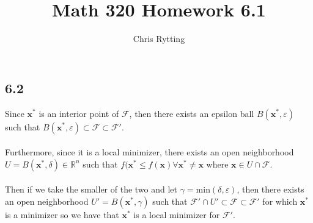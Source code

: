 \documentclass[letterpaper,12pt]{article}
\theoremstyle{definition}
\begin{document}
\title{Math 320 Homework 6.1}
\author{Chris Rytting}
\maketitle

\subsection*{6.2}
Since $\textbf{x}^* $ is an interior point of $\mathscr{F}$, then there exists an epsilon ball $B(\textbf{x}^*, \varepsilon) $ such that $B(\textbf{x}^*, \varepsilon) \subset \mathscr{F}\subset \mathscr{F}' $.\\\\
Furthermore, since it is a local minimizer, there exists an open neighborhood $U = B(\textbf{x}^*, \delta) \in \mathbb{R}^n $ such that $f(\textbf{x}^* \leq f(\textbf{x}) \forall \textbf{x}^* \neq \textbf{x}$ where $\textbf{x} \in U \cap \mathscr{F} $.\\\\
 Then if we take the smaller of the two and let $\gamma = \text{min}(\delta,\varepsilon)$, then there exists an open neighborhood $U' = B(\textbf{x}^*,\gamma) $ such that $\mathscr{F}' \cap U' \subset \mathscr{F}\subset \mathscr{F}'$  for which $\textbf{x}^*  $ is a minimizer so we have that $\textbf{x}^* $ is a local minimizer for $\mathscr{F}'$.
\end{document}
